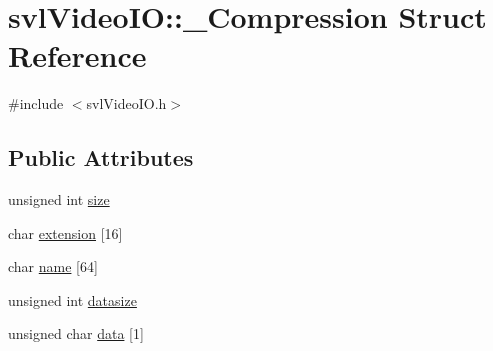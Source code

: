 \hypertarget{structsvl_video_i_o_1_1___compression}{\section{svl\-Video\-I\-O\-:\-:\-\_\-\-Compression Struct Reference}
\label{structsvl_video_i_o_1_1___compression}
}


{\ttfamily \#include $<$svl\-Video\-I\-O.\-h$>$}

\subsection*{Public Attributes}
\begin{DoxyCompactItemize}
\item 
unsigned int \hyperlink{structsvl_video_i_o_1_1___compression_a82d6debeaf90fa62810321f750db7698}{size}
\item 
char \hyperlink{structsvl_video_i_o_1_1___compression_a37304e722770d959f8e7a145f970217c}{extension} \mbox{[}16\mbox{]}
\item 
char \hyperlink{structsvl_video_i_o_1_1___compression_a07b33b8e0f25c4109e482b82cfa556ea}{name} \mbox{[}64\mbox{]}
\item 
unsigned int \hyperlink{structsvl_video_i_o_1_1___compression_a6876320ec774c4563aec48b1cb5d1d52}{datasize}
\item 
unsigned char \hyperlink{structsvl_video_i_o_1_1___compression_a57ec1df325f407de8fb9cf39c89e28e1}{data} \mbox{[}1\mbox{]}
\end{DoxyCompactItemize}


